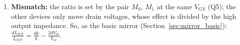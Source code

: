 \begin{enumerate}
    \(M_2\) saturated needs \(V_{DS_2} \geq V_{ov_2} = V_{GS_2} - V_{th}\):
    \begin{align*}
      V_{OUT} - V_X &\geq V_{Y} - V_{X} - V_{th} \\
      V_{OUT} &\geq V_Y - V_{th} \\
      V_{OUT,\min} &= V_Y - V_{th} \\
      R_{L,\max} &= \frac{V_{cc} - V_{OUT,\min}}{I_{OUT}}
    \end{align*}
  \item \textbf{Mismatch:} the ratio is set by the pair \(M_0\), \(M_1\) at the same \(V_{GS}\) (Q5); the other devices only
    move drain voltages, whose effect is divided by the high output impedance. So, as the basic mirror
    (Section~\ref{sec:mirror_basic}): \(\frac{dI_{OUT}}{I_{OUT}} = \frac{dk}{k} - \frac{2dV_{th}}{V_{ov}}\).
\end{enumerate}

